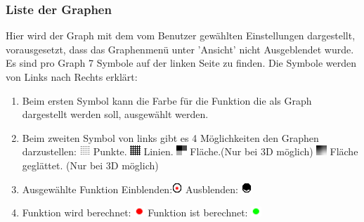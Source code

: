 \documentclass{scrartcl}
\begin{document}
\subsubsection{Liste der Graphen}
Hier wird der Graph mit dem vom Benutzer gew\"ahlten Einstellungen dargestellt, vorausgesetzt, dass das Graphenmen\"u unter 'Ansicht' nicht Ausgeblendet wurde. Es sind pro Graph 7 Symbole auf der linken Seite zu finden. Die Symbole werden von Links nach Rechts erkl\"art:
\begin{enumerate}
 \item Beim ersten Symbol kann die Farbe f\"ur die Funktion die als Graph dargestellt werden soll, ausgew\"ahlt werden.
 \item Beim zweiten Symbol von links gibt es 4 M\"oglichkeiten den Graphen darzustellen:
 \subitem \includegraphics[width=0.03\textwidth]{images/gIcons/dots.png} Punkte.
 \subitem \includegraphics[width=0.03\textwidth]{images/gIcons/lines.png} Linien.
 \subitem \includegraphics[width=0.03\textwidth]{images/gIcons/solid.png} Fl\"ache.(Nur bei 3D m\"oglich)
 \subitem \includegraphics[width=0.03\textwidth]{images/gIcons/smooth.png} Fl\"ache gegl\"attet. (Nur bei 3D m\"oglich)
 \item Ausgew\"ahlte Funktion Einblenden:\includegraphics[width=0.03\textwidth]{images/gIcons/visible.png} Ausblenden: \includegraphics[width=0.03\textwidth]{images/gIcons/invisible.png}
 \item Funktion wird berechnet: \includegraphics[width=0.03\textwidth]{images/gIcons/calculating.png} Funktion ist berechnet: \includegraphics[width=0.03\textwidth]{images/gIcons/not_calculating.png}

\end{enumerate}
\end{document}
